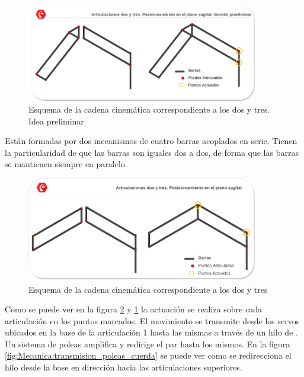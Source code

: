     \begin{figure}[H]
       	\centering
       	\includegraphics[width=0.9\textwidth]{figuras/Imagenes_Mecanica/mecanismos_4_barras_triangulo.png}
       	\caption{Esquema de la cadena cinemática correspondiente a los  dos y tres. Idea preliminar}
       	\label{fig:Mecanica:4_bar_mecanism_triangle}
    \end{figure}

    Están formadas por dos mecanismos de cuatro barras acoplados en serie. Tienen la particularidad de que las barras son iguales dos a dos, de forma que las barras se mantienen siempre en paralelo.
    \\

    \begin{figure}[H]
    	\centering
    	\includegraphics[width=0.9\textwidth]{figuras/Imagenes_Mecanica/mecanismos_4_barras.png}
    	\caption{Esquema de la cadena cinemática correspondiente a los  dos y tres}
    	\label{fig:Mecanica:4_bar_mecanism}
    \end{figure}

    Como se puede ver en la figura \ref{fig:Mecanica:4_bar_mecanism} y \ref{fig:Mecanica:4_bar_mecanism_triangle} la actuación se realiza sobre cada articulación en los puntos marcados. El movimiento se transmite desde los servos ubicados en la base de la articulación 1 hasta las mismas a través de un hilo de . Un sistema de poleas amplifica y redirige el par hasta los mismos. En la figura \ref{fig:Mecanica:transmision_poleas_cuerda} se puede ver como se redirecciona el hilo desde la base en dirección hacia las articulaciones superiores.

